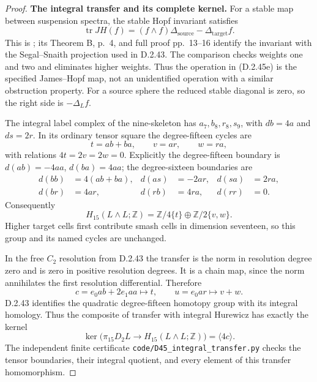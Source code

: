 \begin{proof}
\textbf{The integral transfer and its complete kernel.}
For a stable map between suspension spectra, the stable Hopf
invariant satisfies
\[
 \operatorname{tr}JH(f)
    =(f\wedge f)\Delta_{\mathrm{source}}-\Delta_{\mathrm{target}}f.
 \tag{D.2.45e}
\]
This is \cite[Theorem A(iii), p.~3, with proof pp.~12--13]
{Klein2026Hopf}; its Theorem B, p.~4, and full proof
pp.~13--16 identify the invariant with the Segal--Snaith
projection used in D.2.43.  The comparison checks weights
one and two and eliminates higher weights.  Thus the operation
in (D.2.45e) is the specified James--Hopf map, not an
unidentified operation with a similar obstruction property.
For a source sphere the reduced stable diagonal is zero,
so the right side is $-\Delta_L f$.

The integral label complex of the nine-skeleton has
$a_7,b_8,r_8,s_9$, with $db=4a$ and $ds=2r$.
In its ordinary tensor square the degree-fifteen cycles are
\[
 t=ab+ba,\qquad v=ar,\qquad w=ra,
\]
with relations $4t=2v=2w=0$.  Explicitly the degree-fifteen
boundary is $d(ab)=-4aa$, $d(ba)=4aa$; the degree-sixteen
boundaries are
\[
 \begin{aligned}
 d(bb)&=4(ab+ba),& d(as)&=-2ar,& d(sa)&=2ra,\\
 d(br)&=4ar,& d(rb)&=4ra,& d(rr)&=0.
 \end{aligned}
\]
Consequently
\[
 H_{15}(L\wedge L;\mathbb Z)
   =\mathbb Z/4\{t\}\oplus\mathbb Z/2\{v,w\}.
 \tag{D.2.45f}
\]
Higher target cells first contribute smash cells in dimension
seventeen, so this group and its named cycles are unchanged.

In the free $C_2$ resolution from D.2.43 the transfer is the
norm in resolution degree zero and is zero in positive
resolution degrees.  It is a chain map, since the norm
annihilates the first resolution differential.  Therefore
\[
 c=e_0ab+2e_1aa\longmapsto t,
 \qquad u=e_0ar\longmapsto v+w.
 \tag{D.2.45g}
\]
D.2.43 identifies the quadratic degree-fifteen homotopy group
with its integral homology.  Thus the composite of transfer
with integral Hurewicz has exactly the kernel
\[
       \ker\bigl(\pi_{15}D_2L\longrightarrow
                      H_{15}(L\wedge L;\mathbb Z)\bigr)
                    =\langle4c\rangle.
 \tag{D.2.45h}
\]
The independent finite certificate
\texttt{code/D45\_integral\_transfer.py} checks the tensor
boundaries, their integral quotient, and every element of
this transfer homomorphism.


\end{proof}
